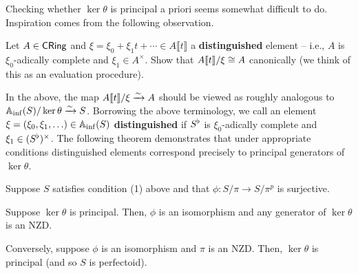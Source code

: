 \documentclass[11pt]{article}
\newcommand{\FPS}[1]{\llbracket{#1}\rrbracket}
\begin{document}
Checking whether $\ker\theta$ is principal a priori seems somewhat difficult to do. Inspiration comes from the following observation.

\begin{exercise}
Let $A\in\operatorname{\mathsf{CRing}}$ and $\xi=\xi_0+\xi_1t+\cdots\in A\FPS{t}$ a \textbf{distinguished} element -- i.e., $A$ is $\xi_0$-adically complete and $\xi_1\in A^{\times}$. Show that $A\FPS{t}/\xi\iso A$ canonically (we think of this as an evaluation procedure).
\end{exercise}

In the above, the map $A\FPS{t}/\xi\xto{\sim}A$ should be viewed as roughly analogous to $\mathbb{A}_{\inf}(S)/\ker\theta\xrightarrow{\sim}S$. Borrowing the above terminology, we call an element $\xi=(\xi_0,\xi_1,\ldots)\in\mathbb{A}_{\inf}(S)$ \textbf{distinguished} if $S^{\flat}$ is $\xi_0$-adically complete and $\xi_1\in(S^{\flat})^{\times}$. The following theorem demonstrates that under appropriate conditions distinguished elements correspond precisely to principal generators of $\ker\theta$.

\begin{theorem}\label{check_principal}
Suppose $S$ satisfies condition \textup{(1)} above and that $\phi: S/\pi\to S/\pi^p$ is surjective.
\begin{enum}{\alph}
\item Suppose $\ker\theta$ is principal. Then, $\phi$ is an isomorphism and any generator of $\ker\theta$ is an NZD.
\item Conversely, suppose $\phi$ is an isomorphism and $\pi$ is an NZD. Then, $\ker\theta$ is principal (and so $S$ is perfectoid).
\end{enum}
\end{theorem}
\end{document}
